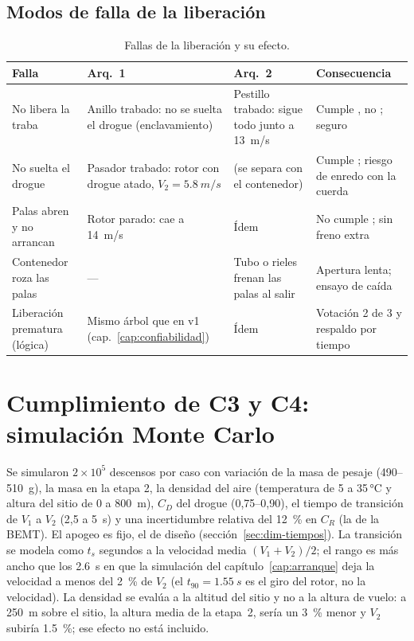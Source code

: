 \subsection{Modos de falla de la liberación}
\begin{table}[H]
\centering\small
\caption{Fallas de la liberación y su efecto.}\label{tab:arq-fallas}
\begin{tabularx}{\textwidth}{@{}lYYY@{}}
\toprule
\textbf{Falla} & \textbf{Arq.~1} & \textbf{Arq.~2} & \textbf{Consecuencia}\\\midrule
No libera la traba & Anillo trabado: no se suelta el drogue (enclavamiento) & Pestillo trabado: sigue todo junto a \SI{13}{m/s} & Cumple , no ; seguro\\
No suelta el drogue & Pasador trabado: rotor con drogue atado, $V_2=\SI{5.8}{m/s}$ & (se separa con el contenedor) & Cumple ; riesgo de enredo con la cuerda\\
Palas abren y no arrancan & Rotor parado: cae a \SI{14}{m/s} & Ídem & No cumple ; sin freno extra\\
Contenedor roza las palas & --- & Tubo o rieles frenan las palas al salir & Apertura lenta; ensayo de caída\\
Liberación prematura (lógica) & Mismo árbol que en v1 (cap.~\ref{cap:confiabilidad}) & Ídem & Votación 2 de 3 y respaldo por tiempo\\
\bottomrule
\end{tabularx}
\end{table}

\section{Cumplimiento de C3 y C4: simulación Monte Carlo}\label{sec:arq-mc}

Se simularon $2\times10^5$ descensos por caso con variación de la masa de pesaje
(490--510~g), la masa en la etapa 2, la densidad del aire (temperatura de 5 a 35\,°C y altura del
sitio de 0 a \SI{800}{m}), $C_D$ del drogue (0,75--0,90), el tiempo de transición de $V_1$ a
$V_2$ (2,5 a \SI{5}{s}) y una incertidumbre relativa del \SI{12}{\percent} en $C_R$ (la de la
BEMT). El apogeo es fijo, el de diseño (sección~\ref{sec:dim-tiempos}). La transición se modela
como $t_s$ segundos a la velocidad media $(V_1+V_2)/2$; el rango es más ancho que los
\SI{2.6}{s} en que la simulación del capítulo~\ref{cap:arranque} deja la velocidad a menos del
\SI{2}{\percent} de $V_2$ (el $t_{90}=\SI{1.55}{s}$ es el giro del rotor, no la velocidad). La
densidad se evalúa a la altitud del sitio y no a la altura de vuelo: a \SI{250}{m} sobre el
sitio, la altura media de la etapa~2, sería un \SI{3}{\percent} menor y $V_2$ subiría
\SI{1.5}{\percent}; ese efecto no está incluido.

